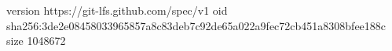 version https://git-lfs.github.com/spec/v1
oid sha256:3de2e08458033965857a8c83deb7c92de65a022a9fec72cb451a8308bfee188c
size 1048672
